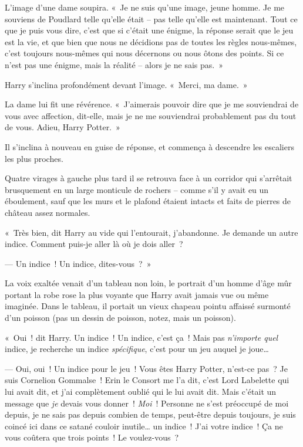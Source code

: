 L'image d'une dame soupira.
«~Je ne suis qu'une image, jeune homme.
Je me souviens de Poudlard telle qu'elle était -- pas telle qu'elle est maintenant.
Tout ce que je puis vous dire, c'est que si c'était une énigme, la réponse serait que le jeu est la vie, et que bien que nous ne décidions pas de toutes les règles nous-mêmes, c'est toujours nous-mêmes qui nous décernons ou nous ôtons des points.
Si ce n'est pas une énigme, mais la réalité -- alors je ne sais pas.~»

Harry s'inclina profondément devant l'image. «~Merci, ma dame.~»

La dame lui fit une révérence. «~J'aimerais pouvoir dire que je me souviendrai de vous avec affection, dit-elle, mais je ne me souviendrai probablement pas du tout de vous. Adieu, Harry Potter.~»

Il s'inclina à nouveau en guise de réponse, et commença à descendre les escaliers les plus proches.

Quatre virages à gauche plus tard il se retrouva face à un corridor qui s'arrêtait brusquement en un large monticule de rochers -- comme s'il y avait eu un éboulement, sauf que les murs et le plafond étaient intacts et faits de pierres de château assez normales.

«~Très bien, dit Harry au vide qui l'entourait, j'abandonne.
Je demande un autre indice.
Comment puis-je aller là où je dois aller~?

--- Un indice~! Un indice, dites-vous~?~»

La voix exaltée venait d'un tableau non loin, le portrait d'un homme d'âge mûr portant la robe rose la plus voyante que Harry avait jamais vue ou même imaginée.
Dans le tableau, il portait un vieux chapeau pointu affaissé surmonté d'un poisson (pas un dessin de poisson, notez, mais un poisson).

«~Oui~! dit Harry. Un indice~! Un indice, c'est ça~! Mais pas \emph{n'importe quel} indice, je recherche un indice \emph{spécifique}, c'est pour un jeu auquel je joue…

--- Oui, oui~! Un indice pour le jeu~! Vous êtes Harry Potter, n'est-ce pas~? Je suis Cornelion Gommalse~!
Erin le Consort me l'a dit, c’est Lord Labelette qui lui avait dit, et j’ai complètement oublié qui le lui avait dit.
Mais c'était un message que \emph{je} devais vous donner~!
\emph{Moi}~! Personne ne s'est préoccupé de moi depuis, je ne sais pas depuis combien de temps, peut-être depuis toujours, je suis coincé ici dans ce satané couloir inutile… un indice~! J'ai votre indice~!
Ça ne vous coûtera que trois points~! Le voulez-vous~?


